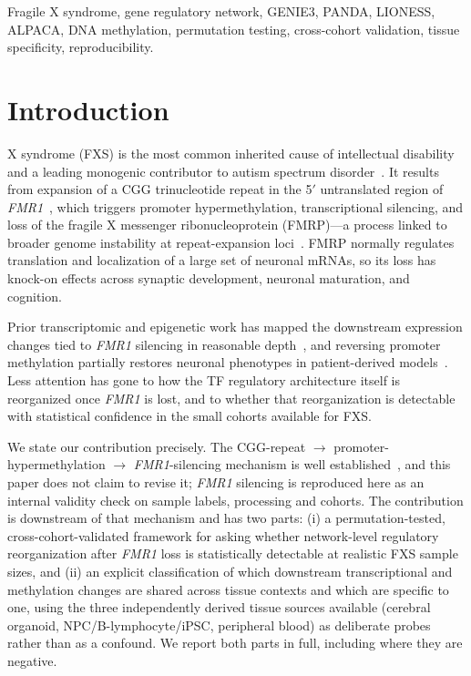 \documentclass[journal]{IEEEtran}
\newcommand{\gene}[1]{\textit{#1}}
\begin{document}
\begin{IEEEkeywords}
Fragile X syndrome, gene regulatory network, GENIE3, PANDA, LIONESS, ALPACA, DNA methylation, permutation testing, cross-cohort validation, tissue specificity, reproducibility.
\end{IEEEkeywords}

\section{Introduction}
 X syndrome (FXS) is the most common inherited cause of intellectual disability and a leading monogenic contributor to autism spectrum disorder~\cite{santoro2012}. It results from expansion of a CGG trinucleotide repeat in the 5$'$ untranslated region of \gene{FMR1}~\cite{peprah2012}, which triggers promoter hypermethylation, transcriptional silencing, and loss of the fragile X messenger ribonucleoprotein (FMRP)---a process linked to broader genome instability at repeat-expansion loci~\cite{hayward2021}. FMRP normally regulates translation and localization of a large set of neuronal mRNAs, so its loss has knock-on effects across synaptic development, neuronal maturation, and cognition.

Prior transcriptomic and epigenetic work has mapped the downstream expression changes tied to \gene{FMR1} silencing in reasonable depth~\cite{li2020,malachowski2023}, and reversing promoter methylation partially restores neuronal phenotypes in patient-derived models~\cite{liu2018,brykczynska2016}. Less attention has gone to how the TF regulatory architecture itself is reorganized once \gene{FMR1} is lost, and to whether that reorganization is detectable with statistical confidence in the small cohorts available for FXS.

We state our contribution precisely. The CGG-repeat $\rightarrow$ promoter-hypermethylation $\rightarrow$ \gene{FMR1}-silencing mechanism is well established~\cite{peprah2012,hayward2021,liu2018,brykczynska2016}, and this paper does not claim to revise it; \gene{FMR1} silencing is reproduced here as an internal validity check on sample labels, processing and cohorts. The contribution is downstream of that mechanism and has two parts: (i) a permutation-tested, cross-cohort-validated framework for asking whether network-level regulatory reorganization after \gene{FMR1} loss is statistically detectable at realistic FXS sample sizes, and (ii) an explicit classification of which downstream transcriptional and methylation changes are shared across tissue contexts and which are specific to one, using the three independently derived tissue sources available (cerebral organoid, NPC/B-lymphocyte/iPSC, peripheral blood) as deliberate probes rather than as a confound. We report both parts in full, including where they are negative.
\end{document}
